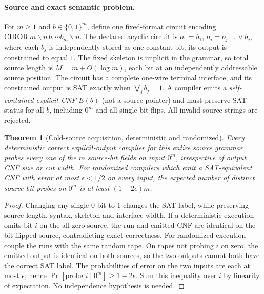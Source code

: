 \documentclass[11pt]{article}
\newtheorem{theorem}{Theorem}
\begin{document}
\paragraph{Source and exact semantic problem.}
For $m\ge1$ and $b\in\{0,1\}^m$, define one fixed-format circuit encoding
$\mathrm{CIROR}\ m\backslash n\,b_1\cdots b_m\backslash n$.
The declared acyclic circuit is $o_1=b_1$, $o_j=o_{j-1}\lor b_j$, where each $b_j$ is independently stored as one constant bit; its output is constrained to equal $1$.
The fixed skeleton is implicit in the grammar, so total source length is $M=m+O(\log m)$, each bit at an independently addressable source position.
The circuit has a complete one-wire terminal interface, and its constrained output is SAT exactly when $\bigvee_j b_j=1$.
A compiler emits a \emph{self-contained explicit CNF} $E(b)$ (not a source pointer) and must preserve SAT status for all $b$, including $0^m$ and all single-bit flips. All invalid source strings are rejected.

\begin{theorem}[Cold-source acquisition, deterministic and randomized]\label{th:reads}
Every deterministic correct explicit-output compiler for this entire source grammar probes every one of the $m$ source-bit fields on input $0^m$, irrespective of output CNF size or cut width.
For randomized compilers which emit a SAT-equivalent CNF with error at most $\epsilon<1/2$ \emph{on every input}, the expected number of distinct source-bit probes on $0^m$ is at least $(1-2\epsilon)m$.
\end{theorem}
\begin{proof}
Changing any single $0$ bit to $1$ changes the SAT label, while preserving source length, syntax, skeleton and interface width.
If a deterministic execution omits bit $i$ on the all-zero source, the run and emitted CNF are identical on the bit-flipped source, contradicting exact correctness.
For randomized execution couple the runs with the same random tape. On tapes not probing $i$ on zero, the emitted output is identical on both sources, so the two outputs cannot both have the correct SAT label.
The probabilities of error on the two inputs are each at most $\epsilon$; hence
$\Pr[\text{probe }i\mid 0^m]\ge1-2\epsilon$.
Sum this inequality over $i$ by linearity of expectation. No independence hypothesis is needed.
\end{proof}
\end{document}
